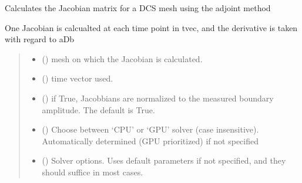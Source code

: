 \documentclass[letterpaper,10pt,english]{sphinxmanual}
\begin{document}
\begin{fulllineitems}
\label{\detokenize{_autosummary/nirfasterff.inverse.jacobian_DCS:nirfasterff.inverse.jacobian_DCS}}
\pysigstartsignatures
\pysiglinewithargsret
{}
{\sphinxparamcomma {}\sphinxparamcomma {}\sphinxparamcomma {}\sphinxparamcomma {}}
{}
\pysigstopsignatures
\sphinxAtStartPar
Calculates the Jacobian matrix for a DCS mesh using the adjoint method

\sphinxAtStartPar
One Jacobian is calcualted at each time point in tvec, and the derivative is taken with regard to aDb
\begin{quote}\begin{description}
\begin{itemize}
\item {} 
\sphinxAtStartPar
{} () \textendash{} mesh on which the Jacobian is calculated.

\item {} 
\sphinxAtStartPar
{} () \textendash{} time vector used.

\item {} 
\sphinxAtStartPar
{} (\sphinxstyleliteralemphasis{\sphinxupquote{, }}) \textendash{} if True, Jacobbians are normalized to the measured boundary amplitude. The default is True.

\item {} 
\sphinxAtStartPar
{} (\sphinxstyleliteralemphasis{\sphinxupquote{, }}) \textendash{} Choose between ‘CPU’ or ‘GPU’ solver (case insensitive). Automatically determined (GPU prioritized) if not specified

\item {} 
\sphinxAtStartPar
{} ({\hyperref[\detokenize{_autosummary/nirfasterff.utils.SolverOptions:nirfasterff.utils.SolverOptions}]{}}\sphinxstyleliteralemphasis{\sphinxupquote{, }}) \textendash{} 
\sphinxAtStartPar
Solver options. Uses default parameters if not specified, and they should suffice in most cases.


\end{itemize}
\end{description}
\end{quote}
\end{fulllineitems}
\end{document}
